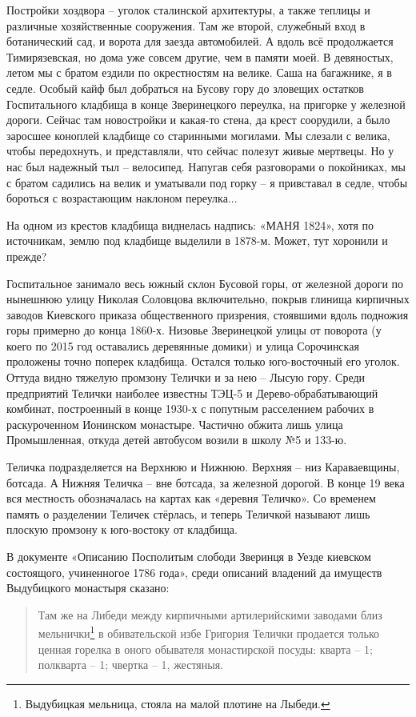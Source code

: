 Постройки хоздвора – уголок сталинской архитектуры, а также теплицы и различные хозяйственные сооружения. Там же второй, служебный вход в ботанический сад, и ворота для заезда автомобилей. А вдоль всё продолжается Тимирязевская, но дома уже совсем другие, чем в памяти моей. В девяностых, летом мы с братом ездили по окрестностям на велике. Саша на багажнике, я в седле. Особый кайф был добраться на Бусову гору до зловещих остатков Госпитального кладбища в конце Зверинецкого переулка, на пригорке у железной дороги. Сейчас там новостройки и какая-то стена, да крест соорудили, а было заросшее коноплей кладбище со старинными могилами. Мы слезали с велика, чтобы передохнуть, и представляли, что сейчас полезут живые мертвецы. Но у нас был надежный тыл – велосипед. Напугав себя разговорами о покойниках, мы с братом садились на велик и уматывали под горку – я привставал в седле, чтобы бороться с возрастающим наклоном переулка...

На одном из крестов кладбища виднелась надпись: «МАНЯ 1824», хотя по источникам, землю под кладбище выделили в 1878-м. Может, тут хоронили и прежде?

Госпитальное занимало весь южный склон Бусовой горы, от железной дороги по нынешнюю улицу Николая Соловцова включительно, покрыв глинища кирпичных заводов Киевского приказа общественного призрения, стоявшими вдоль подножия горы примерно до конца 1860-х. Низовье Зверинецкой улицы от поворота (у коего по 2015 год оставались деревянные домики) и улица Сорочинская проложены точно поперек кладбища. Остался только юго-восточный его уголок. Оттуда видно тяжелую промзону Телички и за нею – Лысую гору. Среди предприятий Телички наиболее известны ТЭЦ-5 и Дерево-обрабатывающий комбинат, построенный в конце 1930-х с попутным расселением рабочих в раскуроченном Ионинском монастыре. Частично обжита лишь улица Промышленная, откуда детей автобусом возили в школу №5 и 133-ю. 

Теличка подразделяется на Верхнюю и Нижнюю. Верхняя – низ Караваевщины, ботсада. А Нижняя Теличка – вне ботсада, за железной дорогой. В конце 19 века вся местность обозначалась на картах как «деревня Теличко». Со временем память о разделении Теличек стёрлась, и теперь Теличкой называют лишь плоскую промзону к юго-востоку от кладбища. 

В документе «Описанию Посполитым слободи Зверинця в Уезде киевском состоящого, учиненногое 1786 года», среди описаний владений да имуществ Выдубицкого монастыря сказано:

\begin{quotation}
Там же на Либеди между кирпичными артилерийскими заводами близ мельнички\footnote{Выдубицкая мельница, стояла на малой плотине на Лыбеди.} в обивательской избе Григория Телички продается только ценная горелка в оного обывателя монастирской посуды: кварта – 1; полкварта – 1; чвертка – 1, жестяныя.\end{quotation}

